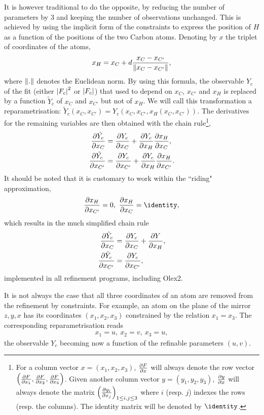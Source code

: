 \documentclass{iucr}
\begin{document}
It is however traditional to do the opposite, by reducing the number of parameters by 3 and keeping the number of observations unchanged. This is achieved by using the implicit form of the constraints to express the position of $H$ as a function of the positions of the two Carbon atoms. Denoting by $x$ the triplet of coordinates of the atoms,
\begin{equation}
x_H = x_C + d \frac{x_C - x_{C'}}{\| x_C - x_{C'} \|},
\end{equation} 
where $\| . \|$ denotes the Euclidean norm. By using this formula, the observable $Y_c$ of the fit (either $\left| F_c \right|^2$ or $\left| F_c \right|$) that used to depend on $x_C$, $x_{C'}$ and $x_H$ is replaced by a function $\tilde{Y}_c$ of $x_C$ and $x_{C'}$ but not of $x_H$. We will call this transformation a reparametrisation: $\tilde{Y}_c(x_C, x_{C'}) = Y_c(x_C, x_{C'}, x_H(x_C, x_{C'}))$. The derivatives for the remaining variables are then obtained with the chain rule\footnote{For a column vector $x=(x_1, x_2, x_3)$, $\frac{\partial F}{\partial x}$ will always denote the row vector $\left(\frac{\partial F}{\partial x_1}, \frac{\partial F}{\partial x_2}, \frac{\partial F}{\partial x_3}\right)$. Given another column vector $y=(y_1, y_2, y_3)$, $\frac{\partial y}{\partial x}$ will always denote the matrix $\left(\frac{\partial y_i}{\partial x_j}\right)_{1 \le i,j \le 3}$ where $i$ (resp. $j$) indexes the rows (resp. the columns). The identity matrix will be denoted by $\identity$.},
\begin{align}
\frac{\partial \tilde{Y_c}}{\partial x_C} &= \frac{\partial Y_c}{\partial x_C} + \frac{\partial Y_c}{\partial x_H} \frac{\partial x_H}{\partial x_C}, \\
\frac{\partial \tilde{Y_c}}{\partial x_{C'}} &= \frac{\partial Y_c}{\partial x_{C'}} + \frac{\partial Y_c}{\partial x_H} \frac{\partial x_H}{\partial x_{C'}}. \nonumber
\end{align}
It should be noted that it is customary to work within the ``riding" approximation,
\begin{align}
\partialder{x_H}{x_{C'}} = 0,\ \partialder{x_H}{x_C} = \identity,
\end{align} 
which results in the much simplified chain rule
\begin{align}
\frac{\partial \tilde{Y}_c}{\partial x_C} &= \frac{\partial Y_c}{\partial x_C} + \frac{\partial Y}{\partial x_H}, \\
\frac{\partial \tilde{Y}_c}{\partial x_{C'}} &= \frac{\partial Y_c}{\partial x_{C'}}, \nonumber
\end{align}
implemented in all refinement programs, including Olex2.

It is not always the case that all three coordinates of an atom are removed from the refinement by constraints. For example, an atom on the plane of the mirror $z,y,x$ has its coordinates $(x_1, x_2, x_3)$ constrained by the relation $x_1 = x_3$. The corresponding reparametrisation reads
\begin{align}
x_1 = u,\ x_2 = v,\ x_3 = u,
\label{eqn:specialposexamplereparam}
\end{align}
the observable $Y_c$ becoming now a function of the refinable parameters $(u,v)$.
\end{document}
